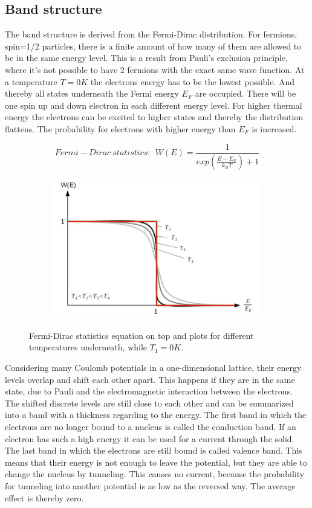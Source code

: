 \documentclass[]{article}
\begin{document}
\subsection{Band structure}
  The band structure is derived from the Fermi-Dirac distribution. For fermions, spin=1/2 particles, there is a finite amount of how many of them are allowed to be in the same energy level. This is a result from Pauli's exclusion principle, where it's not possible to have 2 fermions with the exact same wave function. At a temperature $T=0K$ the electrons energy has to be the lowest possible. And thereby all states underneath the Fermi energy $E_F$ are occupied. There will be one spin up and down electron in each different energy level. For higher thermal energy the electrons can be excited to higher states and thereby the distribution flattens. The probability for electrons with higher energy than $E_F$ is increased.

\begin{figure}[H]
\centering
\begin{subfigure}[b]{1\textwidth}
	\centering
	\begin{equation}
	Fermi-Dirac \ statistics: \:\: W(E) = \frac{1}{exp\left(\frac{E-E_F}{k_B T}\right)+1} 
	\end{equation}
\end{subfigure}
\begin{subfigure}[b]{1\textwidth}
	\centering
	\includegraphics[width=.7\textwidth]{Plots/fd.png}
\end{subfigure}
\caption{Fermi-Dirac statistics equation on top and plots for different temperatures underneath, while $T_1=0K$. \cite{wiki}}
\end{figure}

Considering many Coulomb potentials in a one-dimensional lattice, their energy levels overlap and shift each other apart. This happens if they are in the same state, due to Pauli and the electromagnetic interaction between the electrons. The shifted discrete levels are still close to each other and can be summarized into a band with a thickness regarding to the energy. The first band in which the electrons are no longer bound to a nucleus is called the conduction band. If an electron has such a high energy it can be used for a current through the solid. The last band in which the electrons are still bound is called valence band. This means that their energy is not enough to leave the potential, but they are able to change the nucleus by tunneling. This causes no current, because the probability for tunneling into another potential is as low as the reversed way. The average effect is thereby zero.
\end{document}

